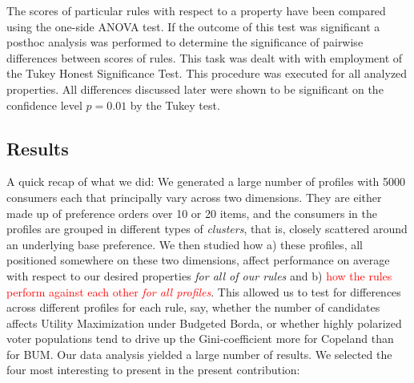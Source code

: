\documentclass{article}
\begin{document}
The scores of particular rules with respect to a property have been compared using the one-side ANOVA test. If the outcome of this test was significant a posthoc analysis was performed to determine the significance of pairwise differences between scores of rules. This task was dealt with with employment of the Tukey Honest Significance Test. This procedure was executed for all analyzed properties. All differences discussed later were shown to be significant on the confidence level $p= 0.01$ by the Tukey test.
\subsection{Results}
A quick recap of what we did: We generated a large number of profiles with 5000 consumers each that principally vary across two dimensions. They are either made up of preference orders over 10 or 20 items, and the consumers in the profiles are grouped in different types of \emph{clusters}, that is, closely scattered around an underlying base preference. We then studied how a) these profiles, all positioned somewhere on these two dimensions, affect performance on average with respect to our desired properties \emph{for all of our rules} and b) \textcolor{red}{how the rules perform against each other \emph{for all profiles}}. This allowed us to test for differences across different profiles for each rule, say, whether the number of candidates affects Utility Maximization under Budgeted Borda, or whether highly polarized voter populations tend to drive up the Gini-coefficient more for Copeland than for BUM.
Our data analysis yielded a large number of results. We selected the four most interesting to present in the present contribution:
\end{document}
